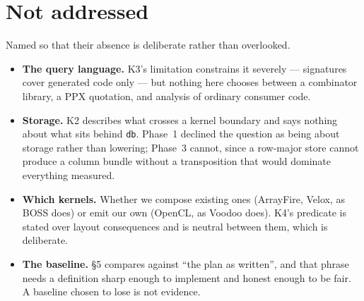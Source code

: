 \documentclass[11pt,a4paper]{article}
\begin{document}
\section{Not addressed}

Named so that their absence is deliberate rather than overlooked.

\begin{itemize}
  \item \textbf{The query language.} K3's limitation constrains it severely
        --- signatures cover generated code only --- but nothing here chooses
        between a combinator library, a PPX quotation, and analysis of
        ordinary consumer code.
  \item \textbf{Storage.} K2 describes what crosses a kernel boundary and says
        nothing about what sits behind \texttt{db}. Phase~1 declined the
        question as being about storage rather than lowering; Phase~3 cannot,
        since a row-major store cannot produce a column bundle without a
        transposition that would dominate everything measured.
  \item \textbf{Which kernels.} Whether we compose existing ones (ArrayFire,
        Velox, as BOSS does) or emit our own (OpenCL, as Voodoo does). K4's
        predicate is stated over layout consequences and is neutral between
        them, which is deliberate.
  \item \textbf{The baseline.} §5 compares against ``the plan as written'',
        and that phrase needs a definition sharp enough to implement and
        honest enough to be fair. A baseline chosen to lose is not evidence.
\end{itemize}
\end{document}
